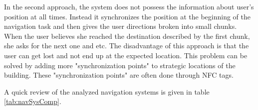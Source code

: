 In the second approach, the system does not possess the information about user's position at all times. Instead it synchronizes the position at the beginning of the navigation task and then gives the user directions broken into small chunks. When the user believes she reached the destination described by the first chunk, she asks for the next one and etc. The disadvantage of this approach is that the user can get lost and not end up at the expected location. This problem can be solved by adding more "synchronization points" to strategic locations of the building. These "synchronization points" are often done through NFC tags.

A quick review of the analyzed navigation systems is given in table \ref{tab:navSysComp}.



